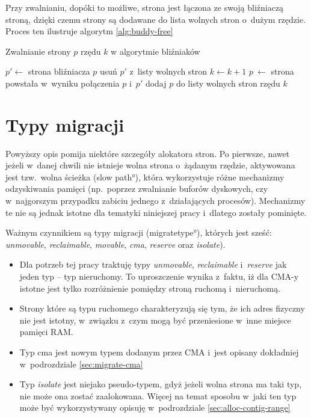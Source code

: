 Przy zwalnianiu, dopóki to możliwe, strona jest łączona ze swoją
bliźniaczą stroną, dzięki czemu strony są dodawane do lista wolnych
stron o~dużym rzędzie.  Proces ten ilustruje algorytm
\ref{alg:buddy-free}

\begin{algorithm}\label{alg:buddy-free}
\caption{Zwalnianie strony $p$ rzędu $k$ w algorytmie bliźniaków}
\begin{algorithmic}[1]
        \State $p' \gets$ strona bliźniacza $p$
        \State usuń $p'$ z~listy wolnych stron
        \State $k \gets k + 1$
        \State $p~\gets$ strona powstała w~wyniku połączenia $p$ i~$p'$
    \EndWhile
    \State dodaj $p$ do listy wolnych stron rzędu $k$\label{alg:buddy-free:add}
\EndProcedure
\end{algorithmic}
\end{algorithm}


\section{Typy migracji}\label{sec:migratetype}

Powyższy opis pomija niektóre szczegóły alokatora stron.  Po pierwsze,
nawet jeżeli w~danej chwili nie istnieje wolna strona o~żądanym
rzędzie, aktywowana jest tzw.\ wolna ścieżka (\ang{slow path}), która
wykorzystuje różne mechanizmy odzyskiwania pamięci (np.\ poprzez
zwalnianie buforów dyskowych, czy w~najgorszym przypadku zabiciu
jednego z~działających procesów).  Mechanizmy te nie są jednak istotne
dla tematyki niniejszej pracy i~dlatego zostały pominięte.

Ważnym czynnikiem są typy migracji (\ang{migratetype}), których jest
sześć: {\it unmovable}, {\it reclaimable}, {\it movable}, {\it cma},
{\it reserve} oraz {\it isolate}).

\begin{itemize}
\item Dla potrzeb tej pracy traktuję typy {\it unmovable}, {\it
  reclaimable} i~{\it reserve} jak jeden typ -- typ nieruchomy.  To
  uproszczenie wynika z~faktu, iż dla CMA-y istotne jest tylko
  rozróżnienie pomiędzy stroną ruchomą i~nieruchomą.
\item Strony które są typu ruchomego charakteryzują się tym, że ich
  adres fizyczny nie jest istotny, w~związku z~czym mogą być
  przeniesione w~inne miejsce pamięci RAM.
\item Typ cma jest nowym typem dodanym przez CMA i~jest opisany
  dokładniej w~podrozdziale \ref{sec:migrate-cma}
\item Typ {\it isolate} jest niejako pseudo-typem, gdyż jeżeli wolna
  strona ma taki typ, nie może ona zostać zaalokowana.  Więcej na
  temat sposobu w~jaki ten typ może być wykorzystywany opisuję
  w~podrozdziale \ref{sec:alloc-contig-range}
\end{itemize}

